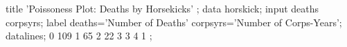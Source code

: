 \begin{listing}
title 'Poissoness Plot: Deaths by Horsekicks' ;
data horskick;
    input deaths corpsyrs;
    label deaths='Number of Deaths'
       corpsyrs='Number of Corps-Years';
   datalines;
    0    109
    1     65
    2     22
    3      3
    4      1
;

\end{listing}

